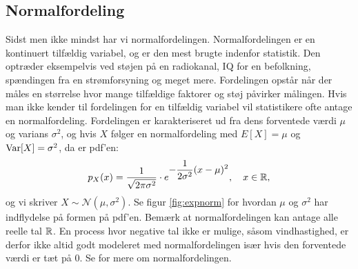 \subsection{Normalfordeling}
Sidst men ikke mindst har vi normalfordelingen. Normalfordelingen er en kontinuert tilfældig variabel, og er den mest brugte indenfor statistik. Den optræder eksempelvis ved støjen på en radiokanal, IQ for en befolkning, spændingen fra en strømforsyning og meget mere.   Fordelingen opstår når der måles en størrelse hvor mange tilfældige faktorer og støj påvirker målingen. Hvis man ikke kender til fordelingen for en tilfældig variabel vil statistikere ofte antage en normalfordeling.  Fordelingen er karakteriseret ud fra dens forventede værdi $\mu$ og varians $\sigma^2$, og hvis $X$ følger en normalfordeling med $E[X] = \mu$ og $\operatorname{Var}[X] = \sigma^2$, da er pdf'en:
\begin{align*}
p_X(x) = \frac{1}{\sqrt{2\pi\sigma^2}}\cdot e^{\displaystyle-\frac{1}{2\sigma^2}(x-\mu)^2}, \quad  x \in \mathbb{R},
\end{align*}
og vi skriver $X \sim \mathcal{N}(\mu,\sigma^2)$. Se figur \ref{fig:expnorm} for hvordan $\mu$ og $\sigma^2$ har indflydelse på formen på pdf'en. Bemærk at normalfordelingen kan antage alle reelle tal $\mathbb{R}$. En process hvor negative tal ikke er mulige, såsom vindhastighed, er derfor ikke altid godt modeleret med normalfordelingen især hvis den forventede værdi er tæt på $0$. Se \cite[127-131]{olofsson2012} for mere om normalfordelingen. 